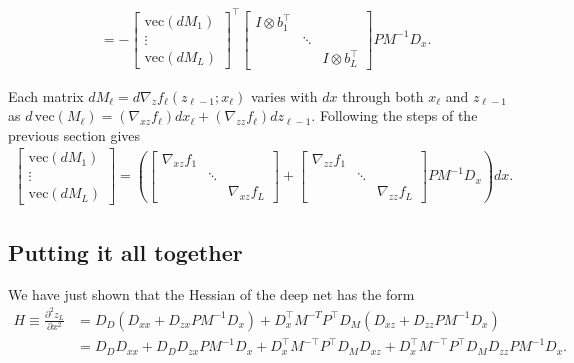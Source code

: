 \documentclass{article}
\begin{document}
\begin{align}
  & = -
  \begin{bmatrix}
    \mathrm{vec} \left(dM_1\right) \\
    \vdots                         \\
    \mathrm{vec} \left(dM_L\right)
  \end{bmatrix}
  ^\top
  \begin{bmatrix}
    I \otimes b_1^\top \\ &\ddots  \\ && I \otimes b_L^\top
  \end{bmatrix}
  PM^{-1} D_x.
\end{align}

Each matrix $dM_\ell = d \nabla_z f_\ell(z_{\ell-1}; x_\ell)$ varies with $dx$ through both $x_\ell$ and $z_{\ell -1}$
as $d\,\mathrm{vec} \left(M_\ell\right) = \left(\nabla_{xz} f_\ell\right) dx_\ell + \left(\nabla_{zz} f_\ell\right)
dz_{\ell-1}$. Following the steps of the previous section gives
\begin{align}
  \begin{bmatrix}
    \mathrm{vec}\left(dM_1\right) \\
    \vdots                        \\
    \mathrm{vec}\left(dM_L\right)
  \end{bmatrix}
  =
  \left(
    \begin{bmatrix}
      \nabla_{xz} f_1 &        &                 \\
      & \ddots &                 \\
      &        & \nabla_{xz} f_L
    \end{bmatrix}
    +
    \begin{bmatrix}
      \nabla_{zz} f_1 \\ &\ddots& \\ && \nabla_{zz} f_L
    \end{bmatrix}
    P M^{-1} D_x
  \right)dx.
\end{align}

\subsection{Putting it all together}

We have just shown that the Hessian of the deep net has the form
\begin{align}
  H \equiv \frac{\partial^2 z_L}{\partial x^2}
  & = D_D \left(D_{xx} + D_{zx} PM^{-1} D_x\right) + D_x^\top M^{-T}P^\top D_M \left(D_{xz}+D_{zz}P M^{-1}D_x\right)           \\
  \label{eq:hessian}
  & = D_DD_{xx}  + D_DD_{zx} PM^{-1} D_x + D_x^\top M^{-\top}P^\top D_M D_{xz}+D_x^\top M^{-\top}P^\top D_M D_{zz}P M^{-1}D_x.
\end{align}
\end{document}
